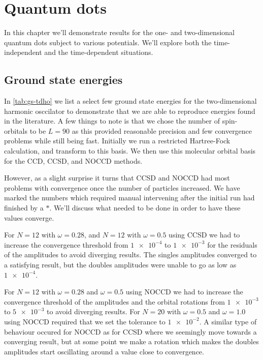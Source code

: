 \chapter{Quantum dots}
    In this chapter we'll demonstrate results for the one- and
    two-dimensional quantum dots subject to various potentials.
    We'll explore both the time-independent and the time-dependent situations.

    \section{Ground state energies}
        In \autoref{tab:gs-tdho} we list a select few ground state energies for
        the two-dimensional harmonic osccilator to demonstrate that we are able
        to reproduce energies found in the literature.
        A few things to note is that we chose the number of spin-orbitals to be
        $L = 90$ as this provided reasonable precision and few convergence
        problems while still being fast.
        Initially we run a restricted Hartree-Fock calculation, and transform to
        this basis.
        We then use this molecular orbital basis for the CCD, CCSD, and NOCCD
        methods.

        However, as a slight surprise it turns that CCSD and NOCCD had most
        problems with convergence once the number of particles increased.
        We have marked the numbers which required manual intervening after the
        initial run had finished by a $*$.
        We'll discuss what needed to be done in order to have these values
        converge.

        For $N = 12$ with $\omega = 0.28$, and $N = 12$ with $\omega = 0.5$
        using CCSD we had to increase the convergence threshold from
        $\num{1e-4}$ to $\num{1e-3}$ for the residuals of the amplitudes to
        avoid diverging results.
        The singles amplitudes converged to a satisfying result, but the doubles
        amplitudes were unable to go as low as $\num{1e-4}$.

        For $N = 12$ with $\omega = 0.28$ and $\omega = 0.5$ using NOCCD we had
        to increase the convergence threshold of the amplitudes and the orbital
        rotations from $\num{1e-3}$ to $\num{5e-3}$ to avoid diverging results.
        For $N = 20$ with $\omega = 0.5$ and $\omega = 1.0$ using NOCCD required
        that we set the tolerance to $\num{1e-2}$.
        A similar type of behaviour occured for NOCCD as for CCSD where we
        seemingly move towards a converging result, but at some point we make a
        rotation which makes the doubles amplitudes start oscillating around a
        value close to convergence.

